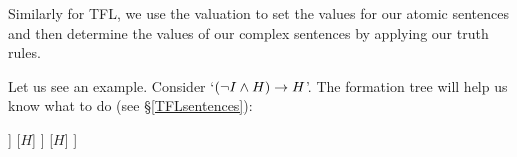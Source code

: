 Similarly for TFL, we use the valuation to set the values for our atomic sentences and then determine the values of our complex sentences by applying our truth rules. 

Let us see an example. Consider 
`$(\neg I\mathbin{\wedge} H)\rightarrow H$'. 
The formation tree will help us know what to do (see \S\ref{TFLsentences}):
\begin{center}
	\begin{forest}
		[$(\enot I\eand H)\mainconnective{\eif} H$
		[$(\enot I\mainconnective{\eor} H)$
		[$\mainconnective{\enot} I$
		[$I$]
		]
		[$H$]
		]
		[$H$]
		]
	\end{forest}
\end{center}

%
%		



